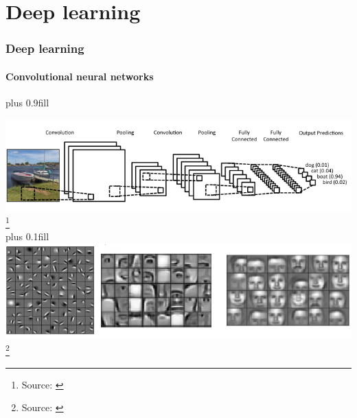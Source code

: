 \documentclass{beamer}
\begin{document}
\section{Deep learning}
\begin{frame}[t]\frametitle{Deep learning}
\framesubtitle{Convolutional neural networks}
\vskip0pt plus 0.9fill
\begin{center}
    \includegraphics[width=\linewidth]{cnnlayout.png} \footnote{Source: \cite{clarifai}}\\
    \vskip0pt plus 0.1fill
    \includegraphics[width=\linewidth]{cnnfeatures.png} \footnote{Source: \cite{conf/icml/LeeGRN09}}
\end{center}
\end{frame}
\end{document}
